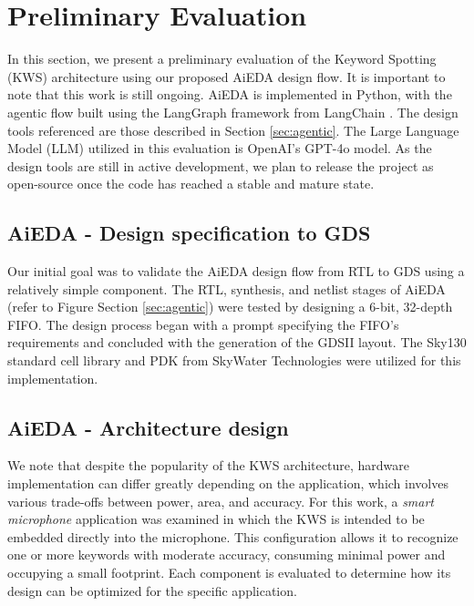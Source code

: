 \section{Preliminary Evaluation}
\label{sec:preliminary_evaluation}
In this section, we present a preliminary evaluation of the Keyword Spotting (KWS) architecture using our proposed AiEDA design flow. It is important to note that this work is still ongoing. AiEDA is implemented in Python, with the agentic flow built using the LangGraph framework from LangChain \cite{langgraph}. The design tools referenced are those described in Section \ref{sec:agentic}. The Large Language Model (LLM) utilized in this evaluation is OpenAI's GPT-4o model. As the design tools are still in active development, we plan to release the project as open-source once the code has reached a stable and mature state.

\subsection{AiEDA - Design specification to GDS}

Our initial goal was to validate the AiEDA design flow from RTL to GDS using a relatively simple component. The RTL, synthesis, and netlist stages of AiEDA (refer to Figure Section \ref{sec:agentic}) were tested by designing a 6-bit, 32-depth FIFO. The design process began with a prompt specifying the FIFO's requirements and concluded with the generation of the GDSII layout. The Sky130 standard cell library and PDK from SkyWater Technologies were utilized for this implementation.

\subsection{AiEDA - Architecture design}
We note that despite the popularity of the KWS architecture, hardware implementation can differ greatly depending on the application, which involves various trade-offs between power, area, and accuracy.
For this work, a \textit{smart microphone } application was examined in which the KWS is intended to be embedded directly into the microphone. This configuration allows it to recognize one or more keywords with moderate accuracy, consuming minimal power and occupying a small footprint. Each component is evaluated to determine how its design can be optimized for the specific application.

